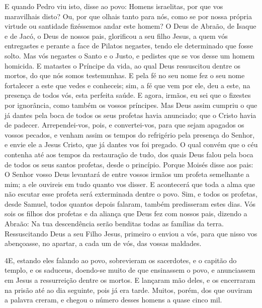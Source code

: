 E quando Pedro viu isto, disse ao povo: Homens israelitas, por
que vos maravilhais disto? Ou, por que olhais tanto para nós, como
se por nossa própria virtude ou santidade fizéssemos andar este
homem? O Deus de Abraão, de Isaque e de Jacó, o Deus de
nossos pais, glorificou a seu filho Jesus, a quem vós entregastes e
perante a face de Pilatos negastes, tendo ele determinado que fosse
solto. Mas vós negastes o Santo e o Justo, e pedistes que se
vos desse um homem homicida. E matastes o Príncipe da vida,
ao qual Deus ressuscitou dentre os mortos, do que nós somos
testemunhas. E pela fé no seu nome fez o seu nome fortalecer
a este que vedes e conheceis; sim, a fé que vem por ele, deu a este,
na presença de todos vós, esta perfeita saúde. E agora,
irmãos, eu sei que o fizestes por ignorância, como também os vossos
príncipes. Mas Deus assim cumpriu o que já dantes pela boca
de todos os seus profetas havia anunciado; que o Cristo havia de
padecer. Arrependei-vos, pois, e convertei-vos, para que
sejam apagados os vossos pecados, e venham assim os tempos do
refrigério pela presença do Senhor, e envie ele a Jesus
Cristo, que já dantes vos foi pregado. O qual convém que o
céu contenha até aos tempos da restauração de tudo, dos quais Deus
falou pela boca de todos os seus santos profetas, desde o princípio.
Porque Moisés disse aos pais: O Senhor vosso Deus levantará
de entre vossos irmãos um profeta semelhante a mim; a ele ouvireis
em tudo quanto vos disser. E acontecerá que toda a alma que
não escutar esse profeta será exterminada dentre o povo. Sim,
e todos os profetas, desde Samuel, todos quantos depois falaram,
também predisseram estes dias. Vós sois os filhos dos
profetas e da aliança que Deus fez com nossos pais, dizendo a
Abraão: Na tua descendência serão benditas todas as famílias da
terra. Ressuscitando Deus a seu Filho Jesus, primeiro o
enviou a vós, para que nisso vos abençoasse, no apartar, a cada um
de vós, das vossas maldades.

\medskip

\lettrine{4} E, estando eles falando ao povo, sobrevieram os
sacerdotes, e o capitão do templo, e os saduceus, doendo-se
muito de que ensinassem o povo, e anunciassem em Jesus a
ressurreição dentre os mortos. E lançaram mão deles, e os
encerraram na prisão até ao dia seguinte, pois já era tarde.
Muitos, porém, dos que ouviram a palavra creram, e chegou o
número desses homens a quase cinco mil.

